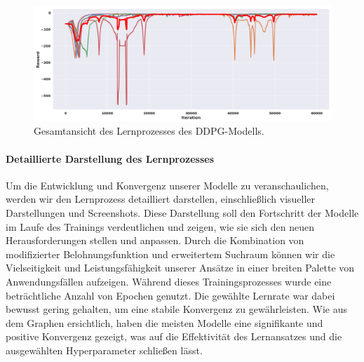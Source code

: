 \begin{figure}[htbp]
\centering
\includegraphics[width=\textwidth]{4Ergebnisse/Phasen/2Phase/2Phase.png}
\caption{Gesamtansicht des Lernprozesses des DDPG-Modells.}
\label{fig:phase 2 whole lern process}
\end{figure}

\paragraph{Detaillierte Darstellung des Lernprozesses}
Um die Entwicklung und Konvergenz unserer Modelle zu veranschaulichen, werden wir den Lernprozess detailliert darstellen, einschließlich visueller Darstellungen und Screenshots. Diese Darstellung soll den Fortschritt der Modelle im Laufe des Trainings verdeutlichen und zeigen, wie sie sich den neuen Herausforderungen stellen und anpassen. Durch die Kombination von modifizierter Belohnungsfunktion und erweitertem Suchraum können wir die Vielseitigkeit und Leistungsfähigkeit unserer Ansätze in einer breiten Palette von Anwendungsfällen aufzeigen. Während dieses Trainingsprozesses wurde eine beträchtliche Anzahl von Epochen genutzt. Die gewählte Lernrate war dabei bewusst gering gehalten, um eine stabile Konvergenz zu gewährleisten. Wie aus dem Graphen ersichtlich, haben die meisten Modelle eine signifikante und positive Konvergenz gezeigt, was auf die Effektivität des Lernansatzes und die ausgewählten Hyperparameter schließen lässt.


